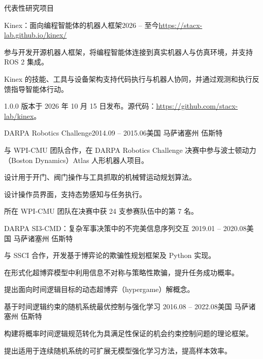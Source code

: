 \documentclass{resume}
\begin{document}
\begin{rSection}{代表性研究项目}

\begin{rSubsection}{Kinex：面向编程智能体的机器人框架}{2026 -- 至今}{}{\url{https://stacx-lab.github.io/kinex/}}
\item 参与开发开源机器人框架，将编程智能体连接到真实机器人与仿真环境，并支持 ROS 2 集成。
\item Kinex 的技能、工具与设备架构支持代码执行与机器人协同，并通过观测和执行反馈指导智能体行动。
\item 1.0.0 版本于 2026 年 10 月 15 日发布。源代码：\url{https://github.com/stacx-lab/kinex}。
\end{rSubsection}

\begin{rSubsection}{DARPA Robotics Challenge}{2014.09 -- 2015.06}{}{美国 马萨诸塞州 伍斯特}
\item 与 WPI-CMU 团队合作，在 DARPA Robotics Challenge 决赛中参与波士顿动力（Boston Dynamics）Atlas 人形机器人项目。
\item 设计用于开门、阀门操作与工具抓取的机械臂运动规划算法。
\item 设计操作员界面，支持态势感知与任务执行。
\item 所在 WPI-CMU 团队在决赛中获 24 支参赛队伍中的第 7 名。
\end{rSubsection}

\begin{rSubsection}
{DARPA SI3-CMD：复杂军事决策中的不完美信息序列交互}
{2019.01 -- 2020.08}{}{美国 马萨诸塞州 伍斯特}
\item 与 SSCI 合作，开发基于博弈论的欺骗性规划框架及 Python 实现。
\item 在形式化超博弈模型中利用信息不对称与策略性欺骗，提升任务成功概率。
\item 提出面向时间逻辑目标的动态超博弈（hypergame）解概念。
\end{rSubsection}

\begin{rSubsection}
{基于时间逻辑约束的随机系统最优控制与强化学习}
{2016.08 -- 2022.08}{}{美国 马萨诸塞州 伍斯特}
\item 构建将概率时间逻辑规范转化为具满足性保证的机会约束控制问题的理论框架。
\item 提出适用于连续随机系统的可扩展无模型强化学习方法，提高样本效率。
\end{rSubsection}

\end{rSection}
\end{document}
